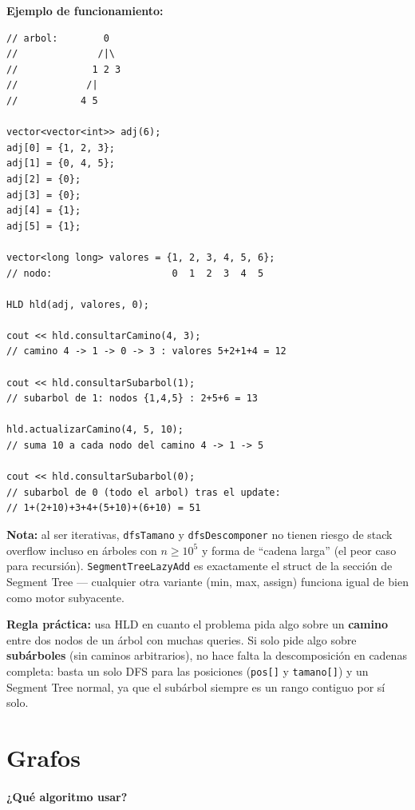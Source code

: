 \documentclass[10pt,a4paper,twocolumn]{article}
\begin{document}
\textbf{Ejemplo de funcionamiento:}

\begin{lstlisting}[style=cpp]
// arbol:        0
//              /|\
//             1 2 3
//            /|
//           4 5

vector<vector<int>> adj(6);
adj[0] = {1, 2, 3};
adj[1] = {0, 4, 5};
adj[2] = {0};
adj[3] = {0};
adj[4] = {1};
adj[5] = {1};

vector<long long> valores = {1, 2, 3, 4, 5, 6};
// nodo:                     0  1  2  3  4  5

HLD hld(adj, valores, 0);

cout << hld.consultarCamino(4, 3);
// camino 4 -> 1 -> 0 -> 3 : valores 5+2+1+4 = 12

cout << hld.consultarSubarbol(1);
// subarbol de 1: nodos {1,4,5} : 2+5+6 = 13

hld.actualizarCamino(4, 5, 10);
// suma 10 a cada nodo del camino 4 -> 1 -> 5

cout << hld.consultarSubarbol(0);
// subarbol de 0 (todo el arbol) tras el update:
// 1+(2+10)+3+4+(5+10)+(6+10) = 51
\end{lstlisting}

\textbf{Nota:} al ser iterativas, \texttt{dfsTamano} y
\texttt{dfsDescomponer} no tienen riesgo de stack overflow incluso en
árboles con $n\ge10^5$ y forma de ``cadena larga'' (el peor caso para
recursión). \texttt{SegmentTreeLazyAdd} es exactamente el struct de
la sección de Segment Tree — cualquier otra variante (min, max,
assign) funciona igual de bien como motor subyacente.

\textbf{Regla práctica:} usa HLD en cuanto el problema pida algo
sobre un \textbf{camino} entre dos nodos de un árbol con muchas
queries. Si solo pide algo sobre \textbf{subárboles} (sin caminos
arbitrarios), no hace falta la descomposición en cadenas completa:
basta un solo DFS para las posiciones (\texttt{pos[]} y
\texttt{tamano[]}) y un Segment Tree normal, ya que el subárbol
siempre es un rango contiguo por sí solo.



\part{Grafos}

\subsection{¿Qué algoritmo usar?}
\end{document}
